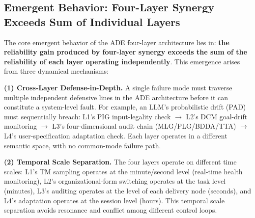 \documentclass[11pt,a4paper]{article}
\begin{document}
\begin{center}
\end{center}

\subsection{Emergent Behavior: Four-Layer Synergy Exceeds Sum of Individual Layers}

The core emergent behavior of the ADE four-layer architecture lies in: \textbf{the reliability gain produced by four-layer synergy exceeds the sum of the reliability of each layer operating independently}. This emergence arises from three dynamical mechanisms:

\smallskip
\noindent\textbf{(1) Cross-Layer Defense-in-Depth.} A single failure mode must traverse multiple independent defensive lines in the ADE architecture before it can constitute a system-level fault. For example, an LLM's probabilistic drift (PAD) must sequentially breach: L1's PIG input-legality check $\rightarrow$ L2's DCM goal-drift monitoring $\rightarrow$ L3's four-dimensional audit chain (MLG/PLG/BDDA/TTA) $\rightarrow$ L4's user-specification adaptation check. Each layer operates in a different semantic space, with no common-mode failure path.

\noindent\textbf{(2) Temporal Scale Separation.} The four layers operate on different time scales: L1's TM sampling operates at the minute/second level (real-time health monitoring), L2's organizational-form switching operates at the task level (minutes), L3's auditing operates at the level of each delivery node (seconds), and L4's adaptation operates at the session level (hours). This temporal scale separation avoids resonance and conflict among different control loops.
\end{document}

